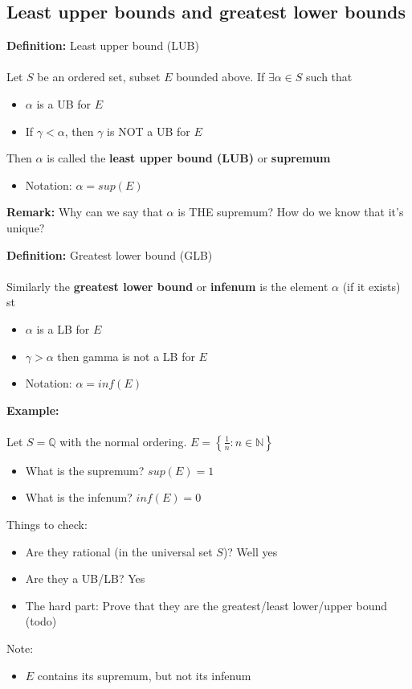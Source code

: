 \documentclass{article}
\newcommand{\Q}{\mathbb{Q}}
\newcommand{\N}{\mathbb{N}}
\begin{document}
\subsection{Least upper bounds and greatest lower bounds}
\begin{definition} 
	\textbf{Definition:} Least upper bound (LUB)\\
~\\
Let $S$ be an ordered set, subset $E$ bounded above. If $\exists\alpha\in S$ such that 
\begin{itemize}
	\item $\alpha$ is a UB for $E$
	\item If $\gamma < \alpha$, then $\gamma$ is NOT a UB for $E$
\end{itemize}
Then $\alpha$ is called the {\color{blue} \textbf{least upper bound (LUB)}} or {\color{blue} \textbf{supremum}}
\begin{itemize}
	\item Notation: $\alpha = sup(E)$
\end{itemize}
\end{definition}
\begin{remark} 
\textbf{Remark:} Why can we say that $\alpha$ is THE supremum? How do we know that it's unique?
\end{remark}
\begin{definition} 
	\textbf{Definition:} Greatest lower bound (GLB) \\
~\\
Similarly the {\color{blue} \textbf{greatest lower bound}} or {\color{blue} \textbf{infenum}} is the element $\alpha$ (if it exists) st 
\begin{itemize}
	\item $\alpha$ is a LB for $E$
	\item $\gamma > \alpha$ then gamma is not a LB for $E$
	\item Notation: $\alpha = inf(E)$
\end{itemize}
\end{definition}
\begin{example} 
\textbf{Example:}  \\
~\\
Let $S=\Q$ with the normal ordering. $E = \left\{\frac{1}{n}: n\in\N\right\}$
\begin{itemize}
	\item What is the supremum? $sup(E) = 1$
	\item What is the infenum? $inf(E) = 0$
\end{itemize}
Things to check:
\begin{itemize}
	\item Are they rational (in the universal set $S$)? Well yes
	\item Are they a UB/LB? Yes
	\item The hard part: Prove that they are the greatest/least lower/upper bound (todo)
\end{itemize}
Note:
\begin{itemize}
	\item $E$ contains its supremum, but not its infenum
\end{itemize}
\end{example}
\end{document}
